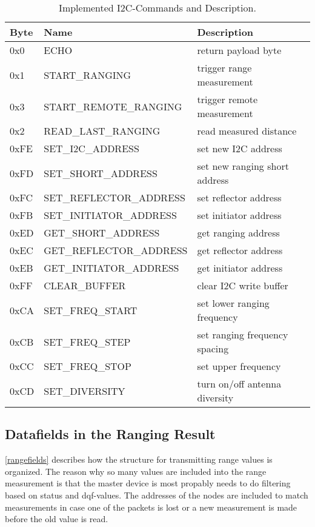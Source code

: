 \begin{table}
	
	\begin{tabularx}{\columnwidth}{l | l | X}
	Byte & Name & Description \\ \hline
	0x0  & ECHO & return payload byte\\
	0x1  & START\_RANGING & trigger range measurement\\
	0x3  & START\_REMOTE\_RANGING & trigger remote measurement\\
	0x2  & READ\_LAST\_RANGING & read measured distance\\
	0xFE & SET\_I2C\_ADDRESS & set new I2C address\\
	0xFD & SET\_SHORT\_ADDRESS & set new ranging short address\\
	0xFC & SET\_REFLECTOR\_ADDRESS & set reflector address\\
	0xFB & SET\_INITIATOR\_ADDRESS & set initiator address\\
	0xED & GET\_SHORT\_ADDRESS & get ranging address\\
	0xEC & GET\_REFLECTOR\_ADDRESS & get reflector address\\
	0xEB & GET\_INITIATOR\_ADDRESS & get initiator address\\
	0xFF & CLEAR\_BUFFER & clear I2C write buffer\\
	0xCA & SET\_FREQ\_START & set lower ranging frequency\\
	0xCB & SET\_FREQ\_STEP & set ranging frequency spacing\\
	0xCC & SET\_FREQ\_STOP & set upper frequency\\
	0xCD & SET\_DIVERSITY & turn on/off antenna diversity\\
	\end{tabularx}

	\caption[Implemented I2C-Commands and Description]{Implemented I2C-Commands and Description.}
	\label{i2ccommands}
	
\end{table}

\subsection{Datafields in the Ranging Result}
\autoref{rangefields} describes how the structure for transmitting range values is organized.
The reason why so many values are included into the range measurement is that the master device is most propably needs to do filtering based on status and dqf-values. The addresses of the nodes are included to match measurements in case one of the packets is lost or a new measurement is made before the old value is read.

